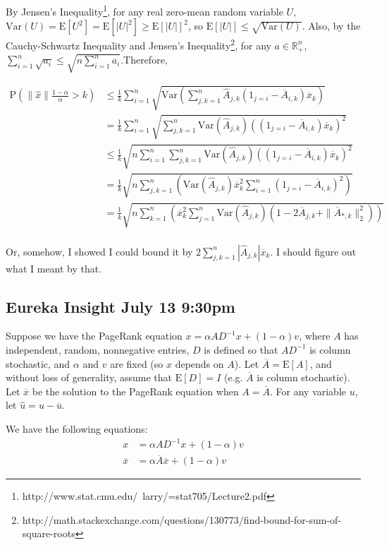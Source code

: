 \documentclass{article}
\newcommand \E[1] {\mathrm E \left[#1\right]} %
\newcommand \Var[1] {\mathrm {Var} \left(#1\right)} %
\newcommand \p[1] {\mathrm P \left(#1\right)}
\newcommand \inv [1] {{#1}^{-1}} %
\begin{document}
By Jensen's Inequality\footnote{http://www.stat.cmu.edu/~larry/=stat705/Lecture2.pdf}, for any real  zero-mean random variable $U$, $\Var U = \E{U^2} = \E{|U|^2}\geq \E{|U|}^2$, so $\E{|U|}\leq\sqrt{\Var U}$. Also, by the Cauchy-Schwartz Inequality and Jensen's Inequality\footnote{http://math.stackexchange.com/questions/130773/find-bound-for-sum-of-square-roots}, for any $a\in\mathbb R_+^n$, $\sum_{i=1}^n \sqrt{a_i} \leq \sqrt{n\sum_{i=1}^n a_i}$.Therefore,

\begin{align*}
\p{\|\hat x\| \frac{1-\alpha}\alpha > k} &\leq \frac 1 k \sum_{i=1}^n \sqrt{\Var{\sum_{j,k=1}^n \hat A_{j,k}(1_{j=i} - \overline A_{i,k})\overline x_k}} \\
&= \frac 1 k \sum_{i=1}^n \sqrt{\sum_{j,k=1}^n \Var{\hat A_{j,k}}\left((1_{j=i} - \overline A_{i,k})\overline x_k\right)^2} \\
&\leq \frac 1 k \sqrt{n\sum_{i=1}^n \sum_{j,k=1}^n \Var{\hat A_{j,k}}\left((1_{j=i} - \overline A_{i,k})\overline x_k\right)^2} \\
&= \frac 1 k \sqrt{n\sum_{j,k=1}^n \left(\Var{\hat A_{j,k}} \overline x_k^2 \sum_{i=1}^n \left(1_{j=i} - \overline A_{i,k}\right)^2\right)} \\
&= \frac 1 k \sqrt{n\sum_{k=1}^n \left( \overline x_k^2 \sum_{j=1}^n \Var{\hat A_{j,k}} (1-2\overline A_{j,k}+\|\overline A_{*,k}\|_2^2) \right) } \\
\end{align*}

Or, somehow, I showed I could bound it by $2\sum_{j,k=1}^n |\hat A_{j,k}|\overline x_k$. I should figure out what I meant by that.

\subsection{Eureka Insight July 13 9:30pm}

Suppose we have the PageRank equation $x=\alpha A \inv D x + (1-\alpha)v$, where $A$ has independent, random, nonnegative entries, $D$ is defined so that $A\inv D$ is column stochastic, and $\alpha$ and $v$ are fixed (so $x$ depends on $A$). Let $\overline A=\E A$, and without loss of generality, assume that $\E D=I$ (e.g. $\overline A$ is column stochastic). Let $\overline x$ be the solution to the PageRank equation when $A=\overline A$. For any variable $u$, let $\hat u = u - \overline u$.

We have the following equations:
\begin{align*}
x &= \alpha A \inv D x + (1-\alpha)v \\
\overline x &= \alpha \overline A \overline x + (1-\alpha)v
\end{align*}
\end{document}
